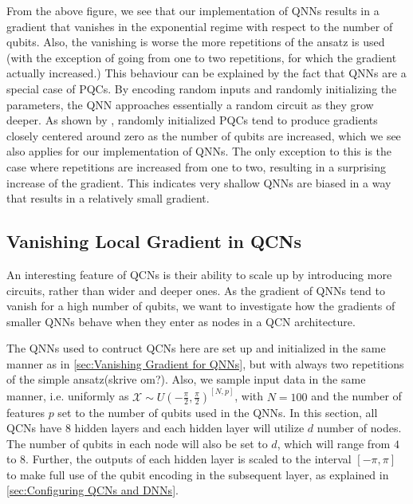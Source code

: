 From the above figure, we see that our implementation of QNNs results in a gradient that vanishes in the exponential regime with respect to the number of qubits. Also, the vanishing is worse the more repetitions of the ansatz is used (with the exception of going from one to two repetitions, for which the gradient actually increased.) This behaviour can be explained by the fact that QNNs are a special case of PQCs. By encoding random inputs and randomly initializing the parameters, the QNN approaches essentially a random circuit as they grow deeper. As shown by \citet{McClean_2018}, randomly initialized PQCs tend to produce gradients closely centered around zero as the number of qubits are increased, which we see also applies for our implementation of QNNs. The only exception to this is the case where repetitions are increased from one to two, resulting in a surprising increase of the gradient. This indicates very shallow QNNs are biased in a way that results in a relatively small gradient.    

\subsection{Vanishing Local Gradient in QCNs}\label{sec:Vanishing Local Gradients in QCNs}

An interesting feature of QCNs is their ability to scale up by introducing more circuits, rather than wider and deeper ones. As the gradient of QNNs tend to vanish for a high number of qubits, we want to investigate how the gradients of smaller QNNs behave when they enter as nodes in a QCN architecture. 

The QNNs used to contruct QCNs here are set up and initialized in the same manner as in \autoref{sec:Vanishing Gradient for QNNs}, but with always two repetitions of the simple ansatz(skrive om?). Also, we sample input data in the same manner, i.e. uniformly as $\mathcal{X} \sim U(-\frac{\pi}{2}, \frac{\pi}{2})^{[N,p]}$, with $N=100$ and the number of features $p$ set to the number of qubits used in the QNNs. In this section, all QCNs have 8 hidden layers and each hidden layer will utilize $d$ number of nodes. The number of qubits in each node will also be set to $d$, which will range from $4$ to $8$. Further, the outputs of each hidden layer is scaled to the interval $[-\pi, \pi]$ to make full use of the qubit encoding in the subsequent layer, as explained in \autoref{sec:Configuring QCNs and DNNs}.

